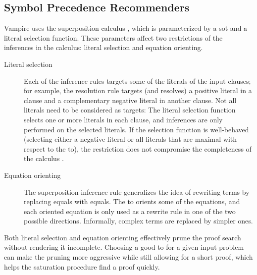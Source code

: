\subsection{Symbol Precedence Recommenders}
\label{sec:contrib:SymbolPrecedenceRecommenders}

Vampire uses the superposition calculus \cite{DBLP:conf/cav/KovacsV13,DBLP:journals/logcom/BachmairG94},
which is parameterized by a \gls{sot} and a literal selection function.
These parameters affect two restrictions of the inferences in the calculus: literal selection and equation orienting.

\begin{description}
\item[Literal selection]
Each of the inference rules targets some of the literals of the input clauses;
for example, the resolution rule targets (and resolves) a positive literal in a clause and a complementary negative literal in another clause.
Not all literals need to be considered as targets:
The literal selection function selects one or more literals in each clause,
and inferences are only performed on the selected literals.
If the selection function is well-behaved
(selecting either a negative literal
or all literals that are maximal with respect to the \gls{to}),
the restriction does not compromise the completeness of the calculus \cite{DBLP:conf/cade/HoderR0V16}.
\item[Equation orienting]
The superposition inference rule generalizes the idea of rewriting terms by replacing equals with equals.
The \gls{to} orients some of the equations, and each oriented equation is only used as a rewrite rule in one of the two possible directions.
Informally, complex terms are replaced by simpler ones.
\end{description}

Both literal selection and equation orienting effectively prune the proof search without rendering it incomplete.
Choosing a good \gls{to} for a given input problem
can make the pruning more aggressive while still allowing for a short proof,
which helps the saturation procedure find a proof quickly.

